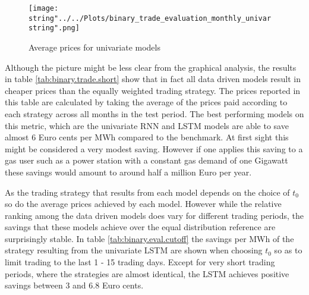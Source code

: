 \begin{figure}[h!]
  \centering
\texttt{[image: \\string"../../Plots/binary\_trade\_evaluation\_monthly\_univar\\string".png]}
  \caption{Average prices for univariate models}\label{fig:binary_trade_evaluation_monthly_univar}
\end{figure}
Although the picture might be less clear from the graphical analysis, the results in table \ref{tab:binary.trade.short} show that in fact all data driven models result in cheaper prices than the equally weighted trading strategy. The prices reported in this table are calculated by taking the average of the prices paid according to each strategy across all months in the test period. The best performing models on this metric, which are the univariate RNN and LSTM models are able to save almost 6 Euro cents per MWh compared to the benchmark. At first sight this might be considered a very modest saving. However if one applies this saving to a gas user such as a power station with a constant gas demand of one Gigawatt these savings would amount to around half a million Euro per year. 

As the trading strategy that results from each model depends on the choice of $t_0$ so do the average prices achieved by each model. However while the relative ranking among the data driven models does vary for different trading periods, the savings that these models achieve over the equal distribution reference are surprisingly stable. In table \ref{tab:binary.eval.cutoff} the savings per MWh of the strategy resulting from the univariate LSTM are shown when choosing $t_0$ so as to limit trading to the last 1 - 15 trading days. Except for very short trading periods, where the strategies are almost identical, the LSTM achieves positive savings between $3$ and $6.8$ Euro cents. 
\FloatBarrier

